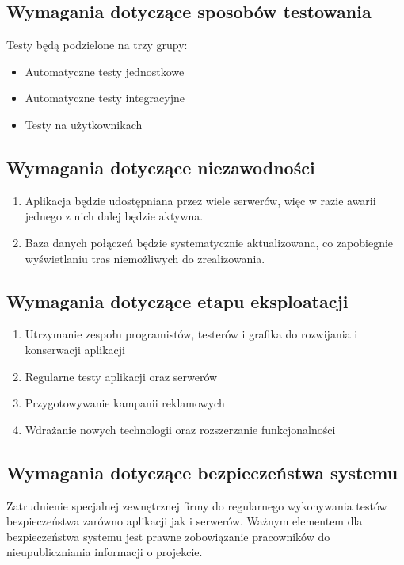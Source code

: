 \documentclass[12pt,a4paper]{report}
\begin{document}
\subsection{Wymagania dotyczące sposobów testowania}
Testy będą podzielone na trzy grupy:
\begin{itemize}
	\item Automatyczne testy jednostkowe
	\item Automatyczne testy integracyjne
	\item Testy na użytkownikach
\end{itemize}
\subsection{Wymagania dotyczące niezawodności}
\begin{enumerate}
	\item Aplikacja będzie udostępniana przez wiele serwerów, więc w razie awarii jednego z nich dalej będzie aktywna.
	\item Baza danych połączeń będzie systematycznie aktualizowana, co zapobiegnie wyświetlaniu tras niemożliwych do zrealizowania.
\end{enumerate}
\subsection{Wymagania dotyczące etapu eksploatacji}
\begin{enumerate}
	\item Utrzymanie zespołu programistów, testerów i grafika do rozwijania i konserwacji aplikacji
	\item Regularne testy aplikacji oraz serwerów
	\item Przygotowywanie kampanii reklamowych
	\item Wdrażanie nowych technologii oraz rozszerzanie funkcjonalności
\end{enumerate}	
\subsection{Wymagania dotyczące bezpieczeństwa systemu}
	Zatrudnienie specjalnej zewnętrznej firmy do regularnego wykonywania testów bezpieczeństwa zarówno aplikacji jak i serwerów. Ważnym elementem dla bezpieczeństwa systemu jest prawne zobowiązanie pracowników do nieupubliczniania informacji o projekcie.
\end{document}
